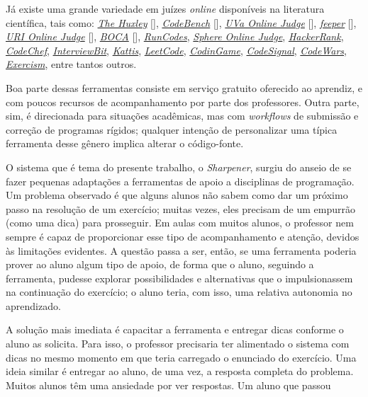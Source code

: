Já existe uma grande variedade em juízes \emph{online} disponíveis na literatura científica,
tais como: 
\hyperref[link:the_huxley]{\emph{The Huxley}} [], 
	\hyperref[link:code_bench]{\emph{CodeBench}} [],  
	\hyperref[link:uva_judge]{\emph{UVa Online Judge}} [], 
	\hyperref[link:feeper]{\emph{feeper}} [], 
	\hyperref[link:uri_judge]{\emph{URI Online Judge}} [], 
	\hyperref[link:boca]{\emph{BOCA}} [],
	\hyperref[link:we_run_codes]{\emph{RunCodes}},
	\hyperref[link:sphere_judge]{\emph{Sphere Online Judge}},
	\hyperref[link:hacker_rank]{\emph{HackerRank}}, 
	\hyperref[link:code_chef]{\emph{CodeChef}}, 
	\hyperref[link:interview_bit]{\emph{InterviewBit}}, 
	\hyperref[link:kattis]{\emph{Kattis}}, 
	\hyperref[link:leet_code]{\emph{LeetCode}}, 
	\hyperref[link:codin_game]{\emph{CodinGame}}, 
	\hyperref[link:code_signal]{\emph{CodeSignal}}, 
	\hyperref[link:code_wars]{\emph{CodeWars}}, 
	\hyperref[link:exercism]{\emph{Exercism}}, 
	entre tantos outros.

Boa parte dessas ferramentas consiste em serviço gratuito oferecido ao aprendiz,
e com poucos recursos de acompanhamento por parte dos professores.
Outra parte, sim, é direcionada para situações acadêmicas, mas com 
\emph{workflows} de submissão e correção de programas rígidos;
qualquer intenção de personalizar uma típica ferramenta desse gênero
implica alterar o código-fonte.

O sistema que é tema do presente trabalho, o \emph{Sharpener}, surgiu do
anseio de se fazer pequenas adaptações a ferramentas de apoio a disciplinas
de programação.
Um problema observado é que alguns alunos não sabem como dar um próximo passo
na resolução de um exercício;
muitas vezes, eles precisam de um empurrão (como uma dica) para prosseguir.
Em aulas com muitos alunos, o professor nem sempre é capaz de proporcionar
esse tipo de acompanhamento e atenção, devidos às limitações evidentes.
A questão passa a ser, então, se uma ferramenta poderia prover ao aluno
algum tipo de apoio, de forma que o aluno, seguindo a ferramenta, pudesse
explorar possibilidades e alternativas que o impulsionassem na continuação
do exercício; o aluno teria, com isso, uma relativa autonomia no aprendizado.

A solução mais imediata é capacitar a ferramenta e entregar dicas conforme
o aluno as solicita. Para isso, o professor precisaria ter alimentado o sistema
com dicas no mesmo momento em que teria carregado o enunciado do exercício.
Uma ideia similar é entregar ao aluno, de uma vez, a resposta completa do problema.
Muitos alunos têm uma ansiedade por ver respostas. 
Um aluno que passou


